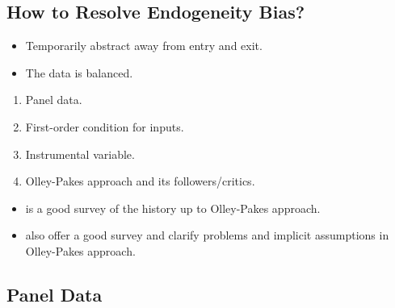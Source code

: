 \documentclass[]{book}
\providecommand{\tightlist}{%
  \setlength{\itemsep}{0pt}\setlength{\parskip}{0pt}}
\begin{document}
\subsection{How to Resolve Endogeneity
Bias?}\label{how-to-resolve-endogeneity-bias}

\begin{itemize}
\tightlist
\item
  Temporarily abstract away from entry and exit.
\item
  The data is balanced.
\end{itemize}

\begin{enumerate}
\def\labelenumi{\arabic{enumi}.}
\tightlist
\item
  Panel data.
\item
  First-order condition for inputs.
\item
  Instrumental variable.
\item
  Olley-Pakes approach and its followers/critics.
\end{enumerate}

\begin{itemize}
\tightlist
\item
  \citet{Griliches1998} is a good survey of the history up to
  Olley-Pakes approach.
\item
  \citet{Ackerberg2015} also offer a good survey and clarify problems
  and implicit assumptions in Olley-Pakes approach.
\end{itemize}

\subsection{Panel Data}\label{panel-data}
\end{document}
